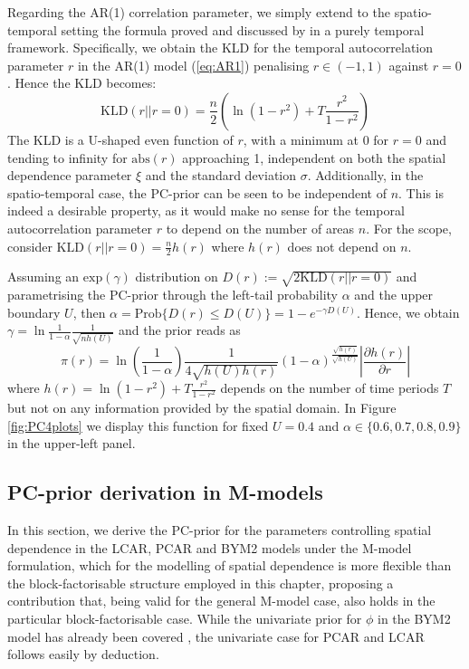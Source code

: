 \documentclass[openany, 11pt, oneside]{book}
\begin{document}
Regarding the AR(1) correlation parameter, we simply extend to the spatio-temporal setting the formula proved and discussed by \cite{Sorbye} in a purely temporal framework. Specifically, we obtain the KLD for the temporal autocorrelation parameter $r$ in the AR(1) model (\ref{eq:AR1}) penalising $r \in (-1, 1)$ against $r=0$. Hence the KLD becomes:
  \begin{equation}
 \mathrm{KLD}(r\lvert\rvert r=0) =   \frac{n}{2}
 \left( \ln(1-r^2)
 +T  \frac{r^2}{1-r^2} \right)
 \end{equation}
The KLD is a U-shaped even function of $r$, with a minimum at 0 for $r=0$ and tending to infinity for $\mathrm{abs}(r)$ approaching 1, independent on both the spatial dependence parameter $\xi$ and the standard deviation $\sigma$.
%  
Additionally, in the spatio-temporal case, the PC-prior can be seen to be independent of $n$. This is indeed a desirable property, as it would make no sense for the temporal autocorrelation parameter $r$ to depend on the number of areas $n$. For the scope, consider $\mathrm{KLD}(r\vert\vert r=0) = \frac{n}{2}h(r)$ where $h(r)$ does not depend on $n$. 

Assuming an $\mathrm{exp}(\gamma)$ distribution on $D(r):=\sqrt{2\mathrm{KLD}(r\vert\vert r=0)}$ and parametrising the PC-prior through the left-tail probability $\alpha$ and the upper boundary $U$, then $\alpha = \mathrm{Prob} \lbrace D(r) \leq D(U) \rbrace =1-e^{-\gamma D(U)}$. Hence,  we obtain $\gamma = \ln \frac{1}{1-\alpha} \frac{1}{\sqrt{n h(U)}}$ and the prior reads as
$$
  \pi(r) = \ln \left(\frac{1}{ 1-\alpha}\right)
  \frac{1}{4\sqrt{h(U)h(r)}} \left(1-\alpha\right)^{
  \frac{\sqrt{ h(r)}}{ \sqrt{h(U)}} 
  }  \left| \frac{\partial h(r)}{\partial r} \right|
$$ 
where $h(r) = \ln\left(1-r^2\right)+T\frac{r^2}{1-r^2}$ depends on the number of time periods $T$ but not on any information provided by the spatial domain.
In Figure \ref{fig:PC4plots} we display this function for fixed $U = 0.4$ and $\alpha \in \lbrace 0.6, 0.7, 0.8, 0.9\rbrace$ in the upper-left panel.


\subsection{PC-prior derivation in M-models} \label{subsection:unpublished}

In this section, we derive the PC-prior for the parameters controlling spatial dependence in the LCAR, PCAR and BYM2 models under the M-model formulation, which for the modelling of spatial dependence is more flexible than the block-factorisable structure employed in this chapter, proposing a contribution that, being valid for the general M-model case, also holds in the particular block-factorisable case. While the univariate prior for $\phi$ in the BYM2 model has already been covered \parencite{BYM2, PC}, the univariate case for PCAR and LCAR follows easily by deduction. 
\end{document}
